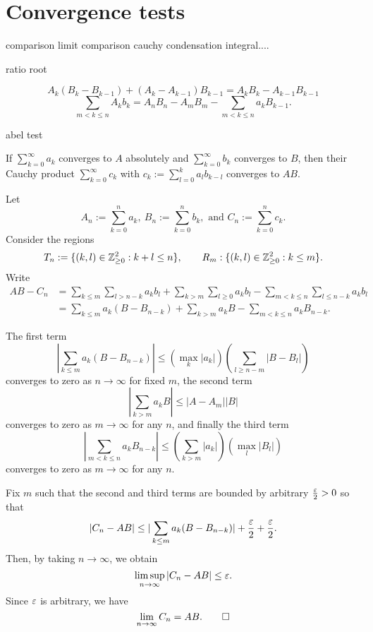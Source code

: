 \documentclass{../note}
\begin{document}
\section{Convergence tests}

comparison
limit comparison
cauchy condensation
integral....

ratio
root



\begin{prb}
\[A_k(B_k-B_{k-1})+(A_k-A_{k-1})B_{k-1}=A_kB_k-A_{k-1}B_{k-1}\]
\[\sum_{m<k\le n}A_kb_k=A_nB_n-A_mB_m-\sum_{m<k\le n}a_kB_{k-1}.\]
\end{prb}

abel test
\begin{prb}
\end{prb}




\begin{prb}
If $\sum_{k=0}^\infty a_k$ converges to $A$ absolutely and $\sum_{k=0}^\infty b_k$ converges to $B$, then their Cauchy product $\sum_{k=0}^\infty c_k$ with $c_k:=\sum_{l=0}^ka_lb_{k-l}$ converges to $AB$.
\end{prb}
\begin{pf}
Let
\[A_n:=\sum_{k=0}^na_k,\ B_n:=\sum_{k=0}^nb_k, \text{ and } C_n:=\sum_{k=0}^nc_k.\]
Consider the regions
\[T_n:=\{(k,l)\in\mathbb{Z}_{\ge0}^2:k+l\le n\},\qquad R_m:\{(k,l)\in\mathbb{Z}_{\ge0}^2:k\le m\}.\]
Write
\begin{align*}
AB-C_n&=\sum_{k\le m}\sum_{l>n-k}a_kb_l+\sum_{k>m}\sum_{l\ge0}a_kb_l-\sum_{m<k\le n}\sum_{l\le n-k}a_kb_l\\
&=\sum_{k\le m}a_k(B-B_{n-k})+\sum_{k>m}a_kB-\sum_{m<k\le n}a_kB_{n-k}.
\end{align*}

The first term
\[|\sum_{k\le m}a_k(B-B_{n-k})|\le(\max_k|a_k|)(\sum_{l\ge n-m}|B-B_l|)\]
converges to zero as $n\to\infty$ for fixed $m$, the second term
\[|\sum_{k>m}a_kB|\le|A-A_m||B|\]
converges to zero as $m\to\infty$ for any $n$, and finally the third term
\[|\sum_{m<k\le n}a_kB_{n-k}|\le(\sum_{k>m}|a_k|)(\max_l|B_l|)\]
converges to zero as $m\to\infty$ for any $n$.

Fix $m$ such that the second and third terms are bounded by arbitrary $\frac{\varepsilon}2>0$ so that
\[|C_n-AB|\le|\sum_{k\le m}a_k(B-B_{n-k})|+\frac{\varepsilon}2+\frac{\varepsilon}2.\]
Then, by taking $n\to\infty$, we obtain
\[\limsup_{n\to\infty}|C_n-AB|\le\varepsilon.\] 
Since $\varepsilon$ is arbitrary, we have
\[\lim_{n\to\infty}C_n=AB.\qedhere\]
\end{pf}
\end{document}
